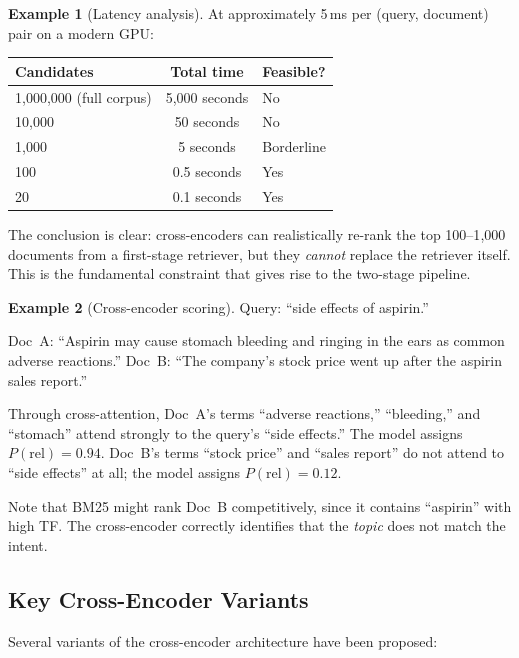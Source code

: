 \documentclass[11pt,a4paper]{article}
\theoremstyle{definition}
\newtheorem{example}{Example}[section]
\theoremstyle{plain}
\begin{document}
\begin{example}[Latency analysis]
\label{ex:latency}
At approximately 5\,ms per (query, document) pair on a modern GPU:
\begin{center}
\begin{tabular}{lcl}
\toprule
\textbf{Candidates} & \textbf{Total time} & \textbf{Feasible?} \\
\midrule
1{,}000{,}000 (full corpus) & 5{,}000 seconds & No \\
10{,}000 & 50 seconds & No \\
1{,}000 & 5 seconds & Borderline \\
100 & 0.5 seconds & Yes \\
20 & 0.1 seconds & Yes \\
\bottomrule
\end{tabular}
\end{center}
\end{example}

The conclusion is clear: cross-encoders can realistically re-rank the top 100--1{,}000 documents from a first-stage retriever, but they \emph{cannot} replace the retriever itself. This is the fundamental constraint that gives rise to the two-stage pipeline.

\begin{example}[Cross-encoder scoring]
Query: ``side effects of aspirin.''

Doc~A: ``Aspirin may cause stomach bleeding and ringing in the ears as common adverse reactions.'' Doc~B: ``The company's stock price went up after the aspirin sales report.''

Through cross-attention, Doc~A's terms ``adverse reactions,'' ``bleeding,'' and ``stomach'' attend strongly to the query's ``side effects.'' The model assigns $P(\text{rel}) = 0.94$. Doc~B's terms ``stock price'' and ``sales report'' do not attend to ``side effects'' at all; the model assigns $P(\text{rel}) = 0.12$.

Note that BM25 might rank Doc~B competitively, since it contains ``aspirin'' with high TF. The cross-encoder correctly identifies that the \emph{topic} does not match the intent.
\end{example}

\subsection{Key Cross-Encoder Variants}

Several variants of the cross-encoder architecture have been proposed:
\end{document}
